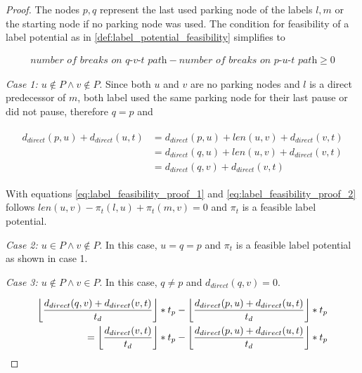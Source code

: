 \begin{proof}
	The nodes $p,q$ represent the last used parking node of the labels $l,m$ or the starting node if no parking node was used. The condition for feasibility of a label potential as in \ref{def:label_potential_feasibility} simplifies to

	\begin{align*}
		\textit{number of breaks on q-v-t path} - \textit{number of breaks on p-u-t path} \ge 0
	\end{align*}

	\emph{Case 1: $u \notin P \land v \notin P$}. Since both $u$ and $v$ are no parking nodes and $l$ is a direct predecessor of $m$, both label used the same parking node for their last pause or did not pause, therefore $q=p$ and

	\begin{align}
		\begin{split}\label{eq:label_feasibility_proof_2}
			d_{direct}(p,u) + d_{direct}(u,t) & = d_{direct}(p,u) + len(u,v) + d_{direct}(v,t) \\
			& = d_{direct}(q,u) + len(u,v) + d_{direct}(v,t) \\
			& = d_{direct}(q,v) + d_{direct}(v,t)
		\end{split}
	\end{align}

	With equations \ref{eq:label_feasibility_proof_1} and \ref{eq:label_feasibility_proof_2} follows $len(u,v) - \pi_t(l,u) + \pi_t(m,v) = 0$ and $\pi_t$ is a feasible label potential.

	\emph{Case 2: $u \in P \land v \notin P$}. In this case, $u = q = p$ and $\pi_t$ is a feasible label potential as shown in case 1.

	\emph{Case 3: $u \notin P \land v \in P$}. In this case, $q \neq p$ and $d_{direct}(q,v) = 0$.

	\begin{align}
		\begin{split}
			\floor*{ \frac{d_{direct}(q,v) + d_{direct}(v,t)}{t_d} } * t_p - \floor*{ \frac{d_{direct}(p,u) + d_{direct}(u,t)}{t_d} } * t_p \\
			= \floor*{ \frac{d_{direct}(v,t)}{t_d} } * t_p - \floor*{ \frac{d_{direct}(p,u) + d_{direct}(u,t)}{t_d} } * t_p
		\end{split}
	\end{align}
\end{proof}


